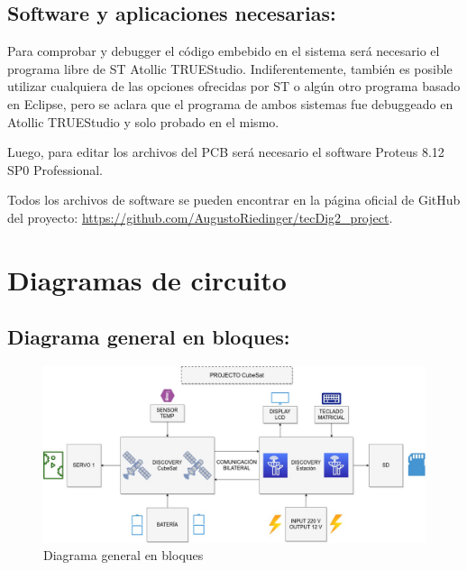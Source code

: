 \documentclass[conference]{IEEEtran}
\begin{document}
\subsection{Software y aplicaciones necesarias:}
\label{sec:org8a55edb}
Para comprobar y debugger el código embebido en el sistema será necesario el programa libre de ST Atollic TRUEStudio. Indiferentemente, también es posible utilizar cualquiera de las opciones ofrecidas por ST o algún otro programa basado en Eclipse, pero se aclara que el programa de ambos sistemas fue debuggeado en Atollic TRUEStudio y solo probado en el mismo.

Luego, para editar los archivos del PCB será necesario el software Proteus 8.12 SP0 Professional.

Todos los archivos de software se pueden encontrar en la página oficial de GitHub del proyecto: \url{https://github.com/AugustoRiedinger/tecDig2\_project}.
\section{Diagramas de circuito}
\label{sec:org24ba558}
\subsection{Diagrama general en bloques:}
\label{sec:orgaff0334}
\begin{figure}[htbp]
\centering
\includegraphics[width=.9\linewidth]{../../images/diagramaBloques.jpg}
\caption{\label{fig:diagramaBloques}Diagrama general en bloques}
\end{figure}
\end{document}
